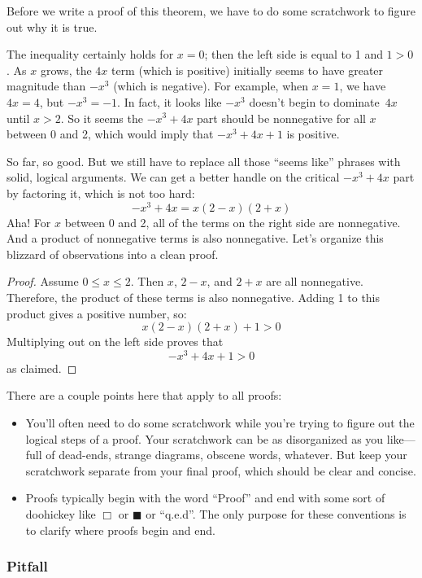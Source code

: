 Before we write a proof of this theorem, we have to do some
scratchwork to figure out why it is true.

The inequality certainly holds for $x = 0$; then the left side is
equal to 1 and $1 > 0$.  As $x$ grows, the $4x$ term (which is
positive) initially seems to have greater magnitude than $-x^3$ (which
is negative).  For example, when $x = 1$, we have $4x = 4$, but $-x^3
= -1$.  In fact, it looks like $-x^3$ doesn't begin to dominate~$4x$
until $x > 2$.  So it seems the $-x^3 + 4x$ part should be nonnegative
for all $x$ between 0 and 2, which would imply that $-x^3 + 4x + 1$ is
positive.

So far, so good.  But we still have to replace all those ``seems
like'' phrases with solid, logical arguments.  We can get a better
handle on the critical $-x^3 + 4x$ part by factoring it, which is not
too hard:
%
\[
-x^3 + 4x = x (2 - x)(2 + x)
\]
%
Aha!  For $x$ between 0 and 2, all of the terms on the right side are
nonnegative.  And a product of nonnegative terms is also nonnegative.
Let's organize this blizzard of observations into a clean proof.

\begin{proof}
Assume $0 \leq x \leq 2$.  Then $x$, $2 - x$, and $2 + x$ are all
nonnegative.  Therefore, the product of these terms is also
nonnegative.  Adding 1 to this product gives a positive number, so:
%
\[
x (2 - x)(2 + x) + 1 > 0
\]
%
Multiplying out on the left side proves that
%
\[
-x^3 + 4x + 1 > 0
\]
%
as claimed.
\end{proof}


There are a couple points here that apply to all proofs:
%
\begin{itemize}

\item You'll often need to do some scratchwork while you're trying to
figure out the logical steps of a proof.  Your scratchwork can be as
disorganized as you like---full of dead-ends, strange diagrams,
obscene words, whatever.  But keep your scratchwork separate from your
final proof, which should be clear and concise.

\item Proofs typically begin with the word ``Proof'' and end with some
  sort of doohickey like $\Box$ or $\blacksquare$ or ``q.e.d''.  The
  only purpose for these conventions is to clarify where proofs begin
  and end.

\end{itemize}

\subsubsection{Pitfall}

